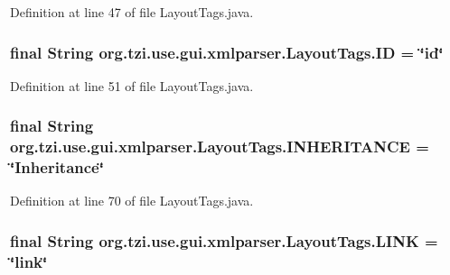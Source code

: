 Definition at line 47 of file Layout\-Tags.\-java.

\hypertarget{classorg_1_1tzi_1_1use_1_1gui_1_1xmlparser_1_1_layout_tags_a1225da77a49d038efc36e01d6e712ba8}{
\subsubsection[{I\-D}]{\setlength{\rightskip}{0pt plus 5cm}final String org.\-tzi.\-use.\-gui.\-xmlparser.\-Layout\-Tags.\-I\-D = \char`\"{}id\char`\"{}\hspace{0.3cm}{\ttfamily [static]}}}\label{classorg_1_1tzi_1_1use_1_1gui_1_1xmlparser_1_1_layout_tags_a1225da77a49d038efc36e01d6e712ba8}


Definition at line 51 of file Layout\-Tags.\-java.

\hypertarget{classorg_1_1tzi_1_1use_1_1gui_1_1xmlparser_1_1_layout_tags_ac8776fa9a54cc94bec4a2ff7a21ba836}{
\subsubsection[{I\-N\-H\-E\-R\-I\-T\-A\-N\-C\-E}]{\setlength{\rightskip}{0pt plus 5cm}final String org.\-tzi.\-use.\-gui.\-xmlparser.\-Layout\-Tags.\-I\-N\-H\-E\-R\-I\-T\-A\-N\-C\-E = \char`\"{}Inheritance\char`\"{}\hspace{0.3cm}{\ttfamily [static]}}}\label{classorg_1_1tzi_1_1use_1_1gui_1_1xmlparser_1_1_layout_tags_ac8776fa9a54cc94bec4a2ff7a21ba836}


Definition at line 70 of file Layout\-Tags.\-java.

\hypertarget{classorg_1_1tzi_1_1use_1_1gui_1_1xmlparser_1_1_layout_tags_a348310317c2c24fc6485ccea29ba681c}{
\subsubsection[{L\-I\-N\-K}]{\setlength{\rightskip}{0pt plus 5cm}final String org.\-tzi.\-use.\-gui.\-xmlparser.\-Layout\-Tags.\-L\-I\-N\-K = \char`\"{}link\char`\"{}\hspace{0.3cm}{\ttfamily [static]}}}\label{classorg_1_1tzi_1_1use_1_1gui_1_1xmlparser_1_1_layout_tags_a348310317c2c24fc6485ccea29ba681c}


